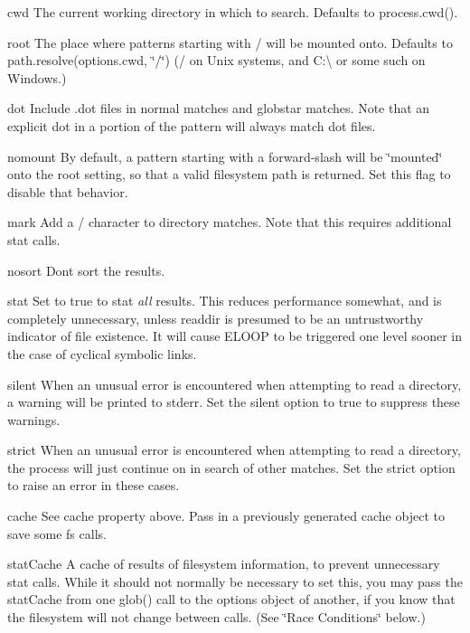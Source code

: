 \begin{DoxyItemize}
\item {\ttfamily cwd} The current working directory in which to search. Defaults to {\ttfamily process.\+cwd()}.
\item {\ttfamily root} The place where patterns starting with {\ttfamily /} will be mounted onto. Defaults to {\ttfamily path.\+resolve(options.\+cwd, \char`\"{}/\char`\"{})} ({\ttfamily /} on Unix systems, and {\ttfamily C\+:\textbackslash{}} or some such on Windows.)
\item {\ttfamily dot} Include {\ttfamily .dot} files in normal matches and {\ttfamily globstar} matches. Note that an explicit dot in a portion of the pattern will always match dot files.
\item {\ttfamily nomount} By default, a pattern starting with a forward-\/slash will be \char`\"{}mounted\char`\"{} onto the root setting, so that a valid filesystem path is returned. Set this flag to disable that behavior.
\item {\ttfamily mark} Add a {\ttfamily /} character to directory matches. Note that this requires additional stat calls.
\item {\ttfamily nosort} Don\textquotesingle{}t sort the results.
\item {\ttfamily stat} Set to true to stat {\itshape all} results. This reduces performance somewhat, and is completely unnecessary, unless {\ttfamily readdir} is presumed to be an untrustworthy indicator of file existence. It will cause E\+L\+O\+OP to be triggered one level sooner in the case of cyclical symbolic links.
\item {\ttfamily silent} When an unusual error is encountered when attempting to read a directory, a warning will be printed to stderr. Set the {\ttfamily silent} option to true to suppress these warnings.
\item {\ttfamily strict} When an unusual error is encountered when attempting to read a directory, the process will just continue on in search of other matches. Set the {\ttfamily strict} option to raise an error in these cases.
\item {\ttfamily cache} See {\ttfamily cache} property above. Pass in a previously generated cache object to save some fs calls.
\item {\ttfamily stat\+Cache} A cache of results of filesystem information, to prevent unnecessary stat calls. While it should not normally be necessary to set this, you may pass the stat\+Cache from one glob() call to the options object of another, if you know that the filesystem will not change between calls. (See \char`\"{}\+Race Conditions\char`\"{} below.)

\end{DoxyItemize}
